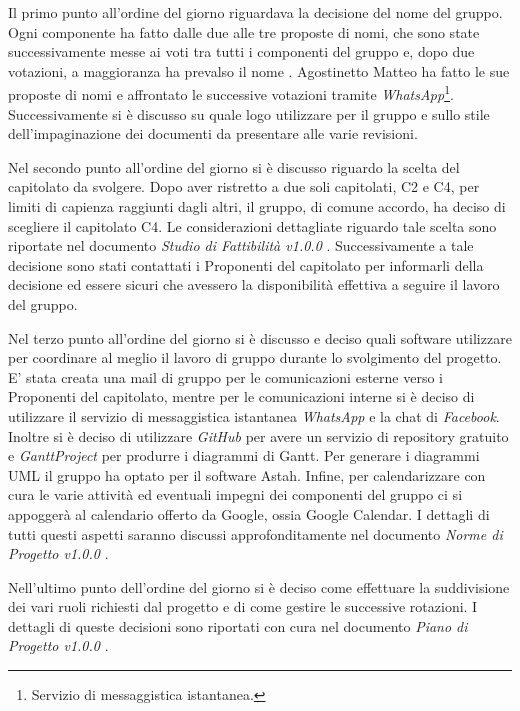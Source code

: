 Il primo punto all'ordine del giorno riguardava la decisione del nome del gruppo. Ogni componente ha fatto dalle due alle tre proposte di nomi, che sono state successivamente messe ai voti tra tutti i componenti del gruppo e, dopo due votazioni, a maggioranza ha prevalso il nome \GRUPPO. Agostinetto Matteo ha fatto le sue proposte di nomi e affrontato le successive votazioni tramite \textit{WhatsApp}\footnote{Servizio di messaggistica istantanea.}. Successivamente si è discusso su quale logo utilizzare per il gruppo e sullo stile dell'impaginazione dei documenti da presentare alle varie revisioni.

\noindent Nel secondo punto all'ordine del giorno si è discusso riguardo la scelta del capitolato da svolgere. Dopo aver ristretto a due soli capitolati, C2 e C4, per limiti di capienza raggiunti dagli altri, il gruppo, di comune accordo, ha deciso di scegliere il capitolato C4. Le considerazioni dettagliate riguardo tale scelta sono riportate nel documento \textit{Studio di Fattibilità v1.0.0} . Successivamente a tale decisione sono stati contattati i Proponenti del capitolato per informarli della decisione ed essere sicuri che avessero la disponibilità effettiva a seguire il lavoro del gruppo.

\noindent Nel terzo punto all'ordine del giorno si è discusso e deciso quali software utilizzare per coordinare al meglio il lavoro di gruppo durante lo svolgimento del progetto. E' stata creata una mail di gruppo per le comunicazioni esterne verso i Proponenti del capitolato, mentre per le comunicazioni interne si è deciso di utilizzare il servizio di messaggistica istantanea \textit{WhatsApp} e la chat di \textit{\gls{Facebook}}. Inoltre si è deciso di utilizzare \textit{\gls{GitHub}} per avere un servizio di \gls{repository} gratuito e \textit{\gls{GanttProject}} per produrre i diagrammi di \gls{Gantt}. Per generare i diagrammi \gls{UML} il gruppo ha optato per il software \gls{Astah}. Infine, per calendarizzare con cura le varie attività ed eventuali impegni dei componenti del gruppo ci si appoggerà al calendario offerto da Google, ossia \gls{Google Calendar}. I dettagli di tutti questi aspetti saranno discussi approfonditamente nel documento \textit{Norme di Progetto v1.0.0} .

\noindent Nell'ultimo punto dell'ordine del giorno si è deciso come effettuare la suddivisione dei vari ruoli richiesti dal progetto e di come gestire le successive rotazioni. I dettagli di queste decisioni sono riportati con cura nel documento \textit{Piano di Progetto v1.0.0} .

